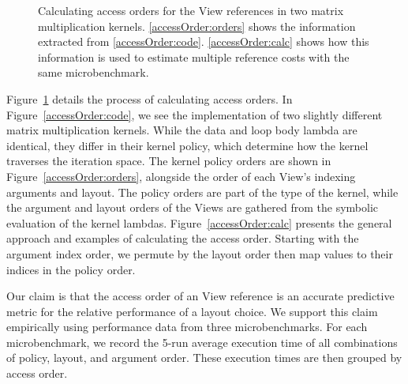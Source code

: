 \documentclass[sigconf,review=true]{acmart}
\begin{document}
\begin{figure}
	
	\caption{Calculating access orders for the View references in two matrix multiplication kernels. \ref{accessOrder:orders} shows the information extracted from \ref{accessOrder:code}. \ref{accessOrder:calc} shows how this information is used to estimate multiple reference costs with the same microbenchmark. }
	\label{accessOrder}
\end{figure}


Figure~\ref{accessOrder} details the process of calculating access orders. 
In Figure~\ref{accessOrder:code}, we see the implementation of two slightly different matrix multiplication kernels. 
While the data and loop body lambda are identical, they differ in their kernel policy, which determine how the kernel traverses the iteration space.
The kernel policy orders are shown in Figure~\ref{accessOrder:orders}, alongside the order of each View's indexing arguments and layout.
The policy orders are part of the type of the kernel, while the argument and layout orders of the Views are gathered from the symbolic evaluation of the kernel lambdas.
Figure~\ref{accessOrder:calc} presents the general approach and examples of calculating the access order.
Starting with the argument index order, we permute by the layout order then map values to their indices in the policy order.

Our claim is that the access order of an View reference is an accurate predictive metric for the relative performance of a layout choice.
We support this claim empirically using performance data from three microbenchmarks.
For each microbenchmark, we record the 5-run average execution time of all combinations of policy, layout, and argument order. 
These execution times are then grouped by access order.
\end{document}
